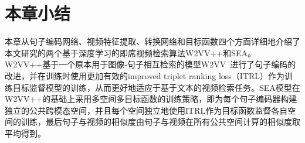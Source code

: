 \section{本章小结}
本章从句子编码网络、视频特征提取、转换网络和目标函数四个方面详细地介绍了本文研究的两个基于深度学习的即席视频检索算法W2VV++和SEA。W2VV++基于一个原本用于图像-句子相互检索的模型W2VV~\cite{dong2018predicting}进行了句子编码的改进，并在训练时使用更加有效的improved triplet ranking loss（ITRL）作为训练目标监督模型的训练，从而更好地适应于基于文本的视频检索任务。SEA模型在W2VV++的基础上采用多空间多目标函数的训练策略，即为每个句子编码器构建独立的公共跨模态空间，并且每个空间独立地使用ITRL作为目标函数监督各自空间的训练，最后句子与视频的相似度由句子与视频在所有公共空间计算的相似度取平均得到。

